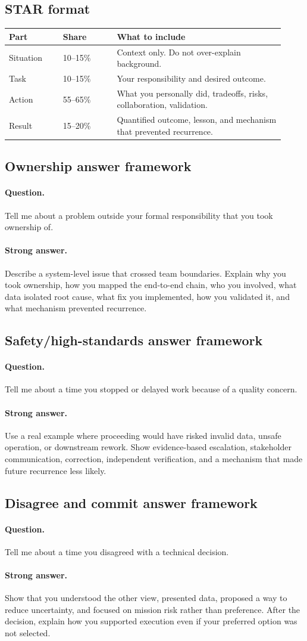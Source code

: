 \documentclass[11pt]{article}
\newcommand{\question}[1]{\paragraph{Question.} #1}
\newcommand{\stronganswer}[1]{\paragraph{Strong answer.} #1}
\begin{document}
\subsection{STAR format}
\begin{longtable}{p{0.18\linewidth}p{0.18\linewidth}p{0.56\linewidth}}
\toprule
\textbf{Part} & \textbf{Share} & \textbf{What to include} \\
\midrule
Situation & 10--15\% & Context only. Do not over-explain background. \\
Task & 10--15\% & Your responsibility and desired outcome. \\
Action & 55--65\% & What you personally did, tradeoffs, risks, collaboration, validation. \\
Result & 15--20\% & Quantified outcome, lesson, and mechanism that prevented recurrence. \\
\bottomrule
\end{longtable}

\subsection{Ownership answer framework}
\question{Tell me about a problem outside your formal responsibility that you took ownership of.}
\stronganswer{Describe a system-level issue that crossed team boundaries.
Explain why you took ownership, how you mapped the end-to-end chain, who you
involved, what data isolated root cause, what fix you implemented, how you
validated it, and what mechanism prevented recurrence.}

\subsection{Safety/high-standards answer framework}
\question{Tell me about a time you stopped or delayed work because of a quality concern.}
\stronganswer{Use a real example where proceeding would have risked invalid data,
unsafe operation, or downstream rework. Show evidence-based escalation,
stakeholder communication, correction, independent verification, and a mechanism
that made future recurrence less likely.}

\subsection{Disagree and commit answer framework}
\question{Tell me about a time you disagreed with a technical decision.}
\stronganswer{Show that you understood the other view, presented data, proposed
a way to reduce uncertainty, and focused on mission risk rather than preference.
After the decision, explain how you supported execution even if your preferred
option was not selected.}
\end{document}
